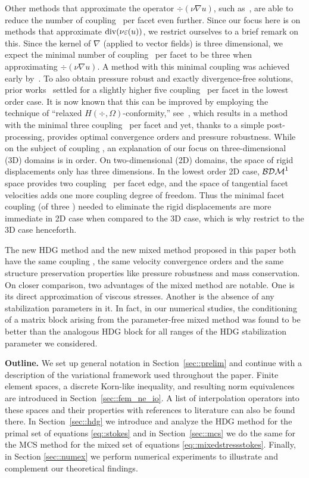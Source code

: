 Other methods that approximate the operator $\div(\nu \nabla u)$,
such as~\cite{CrouzRavia73,LS_CMAME_2016, mcsI}, are able to reduce
the number of coupling \dofs\ per facet even further. Since our focus
here is on methods that approximate $\operatorname{div}(\nu \varepsilon( u))$, we restrict
ourselves to a brief remark on this.  Since the kernel of $\nabla$ (applied to vector fields) is
three dimensional, we expect the minimal number of coupling \dofs\ per
facet to be three when approximating $\div(\nu \nabla u)$. A method
with this minimal coupling was
achieved early by~\cite{CrouzRavia73}.  To also obtain pressure robust and
exactly divergence-free solutions, prior works~\cite{LS_CMAME_2016,
  mcsI} settled for a slightly higher five coupling \dofs\ per facet
in the lowest order case.  It is now known that this can be improved
by employing the technique of ``relaxed
$H(\div, \Omega)$-conformity,''
see~\cite{ledlehrschoe2017relaxedpartI,ledlehrschoe2018relaxedpartII},
which results in a method with the minimal three coupling \dofs\ per facet and yet,
thanks to a simple post-processing, provides optimal convergence
orders and pressure robustness.
While on the subject of coupling \dofs, an 
  explanation of our focus on three-dimensional (3D) domains is in order.
  On two-dimensional (2D)
domains, the space of rigid displacements only has three
dimensions. In the lowest order 2D case, $\mathcal{BDM}^1$ space provides two coupling
\dofs\ per facet edge, and the space of tangential facet velocities
adds one more coupling degree of freedom. Thus the minimal facet
coupling (of three \dofs) needed to eliminate the rigid
displacements are more immediate in 2D case when compared to the 3D
case, which is why restrict to the 3D case henceforth.



The new HDG method and the new mixed method proposed in this paper
both have the same coupling \dofs, the same velocity convergence orders
and the same structure preservation properties like pressure robustness
and mass conservation. On closer comparison, two advantages of the
mixed method are notable. One is its direct approximation of viscous
stresses. Another is the absence of any stabilization parameters in
it. In fact, in our numerical studies, the conditioning of a matrix
block arising from the parameter-free mixed method was found to be better
than the analogous HDG block for all ranges of the HDG stabilization
parameter we considered.




{\bf{Outline.}} We set up general notation in
Section~\ref{sec::prelim} and continue with a description of the
variational framework used throughout the paper.  Finite element spaces, a discrete
Korn-like inequality, and resulting norm equivalences are introduced
in Section~\ref{sec::fem_ne_io}. A list of interpolation operators
into these spaces and their properties with references to literature
can also be found there. In Section~\ref{sec::hdg} we introduce and
analyze the HDG method for the primal set of equations
\eqref{eq::stokes} and in Section~\ref{sec::mcs} we do the same for
the MCS method for the mixed set of equations
\eqref{eq::mixedstressstokes}. Finally, in Section \ref{sec::numex} we
perform numerical experiments to illustrate and complement our
theoretical findings.

